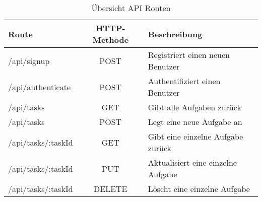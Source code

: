 \begin{table}[h]
\centering
\begin{tabular}{l | c | l }
    \textbf{Route} & \textbf{HTTP-Methode} & \textbf{Beschreibung} \\
    \hline\hline
    /api/signup & POST & Registriert einen neuen Benutzer \\
    /api/authenticate & POST & Authentifiziert einen Benutzer \\
    \hline
    /api/tasks & GET & Gibt alle Aufgaben zurück \\
    /api/tasks & POST & Legt eine neue Aufgabe an \\
    /api/tasks/:taskId & GET & Gibt eine einzelne Aufgabe zurück \\
    /api/tasks/:taskId & PUT & Aktualisiert eine einzelne Aufgabe \\
    /api/tasks/:taskId & DELETE & Löscht eine einzelne Aufgabe \\
\end{tabular}
\caption{Übersicht API Routen}
\label{tbl_api-routes}
\end{table}

